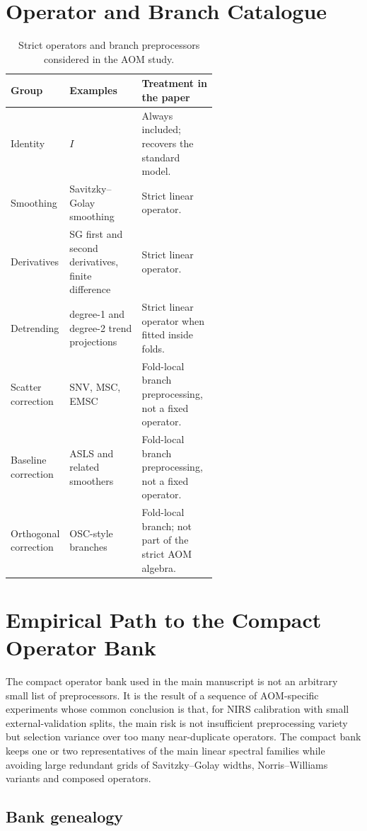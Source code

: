 \documentclass[11pt,a4paper]{article}
\begin{document}
\section{Operator and Branch Catalogue}

\begin{table}[h]
\centering
\caption{Strict operators and branch preprocessors considered in the AOM study.}
\small
\begin{tabularx}{\linewidth}{p{0.23\linewidth}p{0.35\linewidth}X}
\toprule
Group & Examples & Treatment in the paper \\
\midrule
Identity & $I$ & Always included; recovers the standard model.\\
Smoothing & Savitzky--Golay smoothing & Strict linear operator.\\
Derivatives & SG first and second derivatives, finite difference & Strict linear operator.\\
Detrending & degree-1 and degree-2 trend projections & Strict linear operator when fitted inside folds.\\
Scatter correction & SNV, MSC, EMSC & Fold-local branch preprocessing, not a fixed operator.\\
Baseline correction & ASLS and related smoothers & Fold-local branch preprocessing, not a fixed operator.\\
Orthogonal correction & OSC-style branches & Fold-local branch; not part of the strict AOM algebra.\\
\bottomrule
\end{tabularx}
\end{table}

\section{Empirical Path to the Compact Operator Bank}

The compact operator bank used in the main manuscript is not an arbitrary
small list of preprocessors.  It is the result of a sequence of AOM-specific
experiments whose common conclusion is that, for NIRS calibration with small
external-validation splits, the main risk is not insufficient preprocessing
variety but selection variance over too many near-duplicate operators.  The
compact bank keeps one or two representatives of the main linear spectral
families while avoiding large redundant grids of Savitzky--Golay widths,
Norris--Williams variants and composed operators.

\subsection{Bank genealogy}
\end{document}
